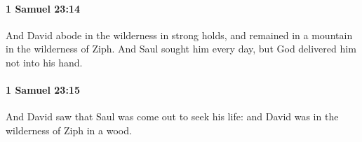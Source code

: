 		\paragraph{1 Samuel 23:14} %
			\label{1SAMUEL-23-14}

			And David abode in the wilderness in strong holds, and remained in a mountain in the wilderness of Ziph. And Saul sought him every day, but God delivered him not into his hand.


		\paragraph{1 Samuel 23:15} %
			\label{1SAMUEL-23-15}

			And David saw that Saul was come out to seek his life: and David was in the wilderness of Ziph in a wood.


